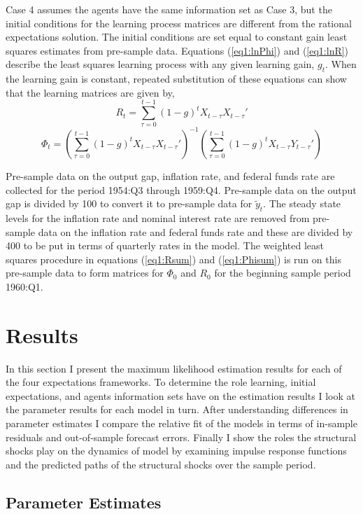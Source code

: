 \documentclass[11pt]{article}
\newcommand{\beq}{\begin{equation}}
\newcommand{\eeq}{\end{equation}}
\begin{document}
Case 4 assumes the agents have the same information set as Case 3, but the initial conditions for the learning process matrices are different from the rational expectations solution.  The initial conditions are set equal to constant gain least squares estimates from pre-sample data.  Equations (\ref{eq1:lnPhi}) and (\ref{eq1:lnR}) describe the least squares learning process with any given learning gain, $g_t$.  When the learning gain is constant, repeated substitution of these equations can show that the learning matrices are given by,
\beq \label{eq1:Rsum} R_t = \sum_{\tau=0}^{t-1} \left(1-g\right)^t X_{t-\tau} X_{t-\tau}' \eeq
\beq \label{eq1:Phisum} \Phi_t = \left( \sum_{\tau=0}^{t-1} \left(1-g\right)^t X_{t-\tau} X_{t-\tau}' \right)^{-1} \left( \sum_{\tau=0}^{t-1} \left(1-g\right)^t X_{t-\tau} Y_{t-\tau}' \right) \eeq

Pre-sample data on the output gap, inflation rate, and federal funds rate are collected for the period 1954:Q3 through 1959:Q4.  Pre-sample data on the output gap is divided by 100 to convert it to pre-sample data for $\tilde{y}_t$.  The steady state levels for the inflation rate and nominal interest rate are removed from pre-sample data on the inflation rate and federal funds rate and these are divided by 400 to be put in terms of quarterly rates in the model.  The weighted least squares procedure in equations (\ref{eq1:Rsum}) and (\ref{eq1:Phisum}) is run on this pre-sample data to form matrices for $\Phi_0$ and $R_0$ for the beginning sample period 1960:Q1. 

\section{Results}

In this section I present the maximum likelihood estimation results for each of the four expectations frameworks.  To determine the role learning, initial expectations, and agents information sets have on the estimation results I look at the parameter results for each model in turn.  After understanding differences in parameter estimates I compare the relative fit of the models in terms of in-sample residuals and out-of-sample forecast errors.  Finally I show the roles the structural shocks play on the dynamics of model by examining impulse response functions and the predicted paths of the structural shocks over the sample period.

\subsection{Parameter Estimates}
\end{document}
